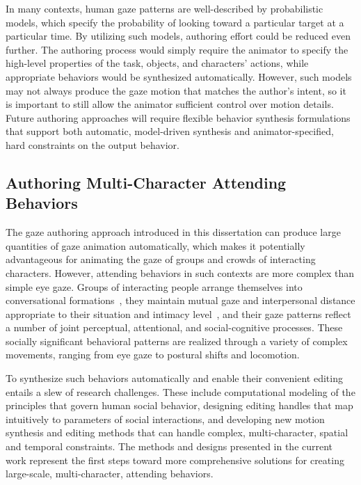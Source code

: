 In many contexts, human gaze patterns are well-described by probabilistic models, which specify the probability of looking toward a particular target at a particular time. By utilizing such models, authoring effort could be reduced even further. The authoring process would simply require the animator to specify the high-level properties of the task, objects, and characters' actions, while appropriate behaviors would be synthesized automatically. However, such models may not always produce the gaze motion that matches the author's intent, so it is important to still allow the animator sufficient control over motion details. Future authoring approaches will require flexible behavior synthesis formulations that support both automatic, model-driven synthesis and animator-specified, hard constraints on the output behavior.

\subsection{Authoring Multi-Character Attending Behaviors}

The gaze authoring approach introduced in this dissertation can produce large quantities of gaze animation automatically, which makes it potentially advantageous for animating the gaze of groups and crowds of interacting characters. However, attending behaviors in such contexts are more complex than simple eye gaze. Groups of interacting people arrange themselves into conversational formations~\citep{kendon2010spacing}, they maintain mutual gaze and interpersonal distance appropriate to their situation and intimacy level~\citep{argyle1965eyecontact}, and their gaze patterns reflect a number of joint perceptual, attentional, and social-cognitive processes. These socially significant behavioral patterns are realized through a variety of complex movements, ranging from eye gaze to postural shifts and locomotion.

To synthesize such behaviors automatically and enable their convenient editing entails a slew of research challenges. These include computational modeling of the principles that govern human social behavior, designing editing handles that map intuitively to parameters of social interactions, and developing new motion synthesis and editing methods that can handle complex, multi-character, spatial and temporal constraints. The methods and designs presented in the current work represent the first steps toward more comprehensive solutions for creating large-scale, multi-character, attending behaviors. 
